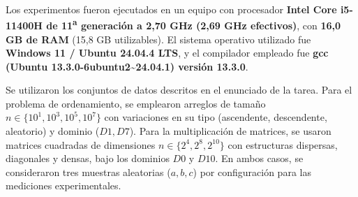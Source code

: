 Los experimentos fueron ejecutados en un equipo con procesador \textbf{Intel\textsuperscript{\textregistered} Core\texttrademark{} i5-11400H de 11\textsuperscript{a} generación a 2,70 GHz (2,69 GHz efectivos)}, con \textbf{16,0 GB de RAM} (15,8 GB utilizables). El sistema operativo utilizado fue \textbf{Windows 11 / Ubuntu 24.04.4 LTS}, y el compilador empleado fue \textbf{gcc (Ubuntu 13.3.0-6ubuntu2\textasciitilde 24.04.1) versión 13.3.0}.

Se utilizaron los conjuntos de datos descritos en el enunciado de la tarea. Para el problema de ordenamiento, se emplearon arreglos de tamaño $n \in \{10^1, 10^3, 10^5, 10^7\}$ con variaciones en su tipo (ascendente, descendente, aleatorio) y dominio ($D1, D7$). Para la multiplicación de matrices, se usaron matrices cuadradas de dimensiones $n \in \{2^4, 2^8, 2^{10}\}$ con estructuras dispersas, diagonales y densas, bajo los dominios $D0$ y $D10$. En ambos casos, se consideraron tres muestras aleatorias ($a, b, c$) por configuración para las mediciones experimentales.